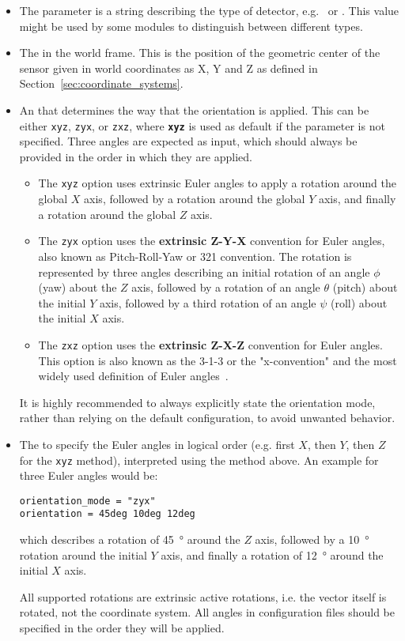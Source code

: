 \begin{itemize}
\item The  parameter is a string describing the type of detector, e.g.\  or . This value might be used by some modules to distinguish between different types.
\item The  in the world frame.
This is the position of the geometric center of the sensor given in world coordinates as X, Y and Z as defined in Section~\ref{sec:coordinate_systems}.
\item An  that determines the way that the orientation is applied.
This can be either \texttt{xyz}, \texttt{zyx}, or \texttt{zxz}, where \textbf{\texttt{xyz}} is used as default if the parameter is not specified. Three angles are expected as input, which should always be provided in the order in which they are applied.
\begin{itemize}
  \item The \texttt{xyz} option uses extrinsic Euler angles to apply a rotation around the global $X$ axis, followed by a rotation around the global $Y$ axis, and finally a rotation around the global $Z$ axis.
  \item The \texttt{zyx} option uses the \textbf{extrinsic Z-Y-X} convention for Euler angles, also known as Pitch-Roll-Yaw or 321 convention. The rotation is represented by three angles describing an initial rotation of an angle $\phi$ (yaw) about the $Z$ axis, followed by a rotation of an angle $\theta$ (pitch) about the initial $Y$ axis, followed by a third rotation of an angle $\psi$ (roll) about the initial $X$ axis.
  \item The \texttt{zxz} option uses the \textbf{extrinsic Z-X-Z} convention for Euler angles. This option is also known as the 3-1-3 or the "x-convention" and the most widely used definition of Euler angles~\cite{eulerangles}.
\end{itemize}
\begin{warning}
It is highly recommended to always explicitly state the orientation mode, rather than relying on the default configuration, to avoid unwanted behavior.
\end{warning}

\item The  to specify the Euler angles in logical order (e.g. first $X$, then $Y$, then $Z$ for the \texttt{xyz} method), interpreted using the method above. An example for three Euler angles would be:
\begin{verbatim}
orientation_mode = "zyx"
orientation = 45deg 10deg 12deg
\end{verbatim}
which describes a rotation of \SI{45}{\degree} around the $Z$ axis, followed by a \SI{10}{\degree} rotation around the initial $Y$ axis, and finally a rotation of \SI{12}{\degree} around the initial $X$ axis.
\begin{warning}
All supported rotations are extrinsic active rotations, i.e. the vector itself is rotated, not the coordinate system. All angles in configuration files should be specified in the order they will be applied.
\end{warning}


\end{itemize}
